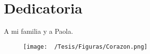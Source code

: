 \chapter*{Dedicatoria}
A mi familia y a Paola.
\vspace{24pt}
\begin{figure}[h]
  \begin{center}
	\texttt{[image: ~/Tesis/Figuras/Corazon.png]}
  \end{center}
\end{figure}
